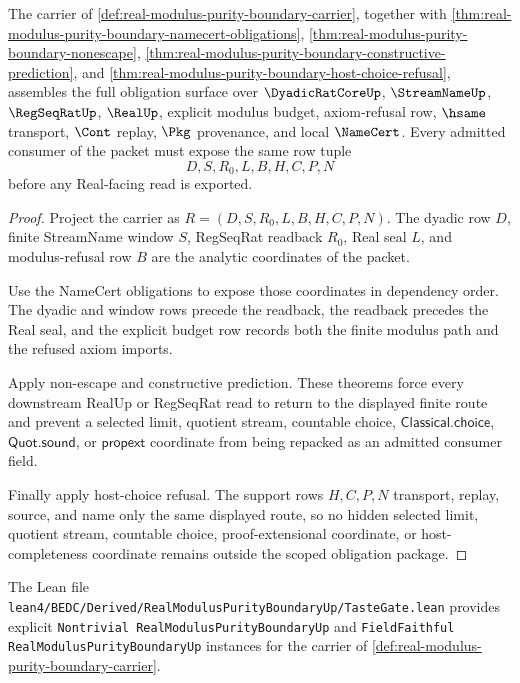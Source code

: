\begin{theorem}
\label{thm:real-modulus-purity-boundary-scope-package}
The carrier of \autoref{def:real-modulus-purity-boundary-carrier}, together with \autoref{thm:real-modulus-purity-boundary-namecert-obligations}, \autoref{thm:real-modulus-purity-boundary-nonescape}, \autoref{thm:real-modulus-purity-boundary-constructive-prediction}, and \autoref{thm:real-modulus-purity-boundary-host-choice-refusal}, assembles the full obligation surface over $\DyadicRatCoreUp$, $\StreamNameUp$, $\RegSeqRatUp$, $\RealUp$, explicit modulus budget, axiom-refusal row, $\hsame$ transport, $\Cont$ replay, $\Pkg$ provenance, and local $\NameCert$. Every admitted consumer of the packet must expose the same row tuple
$$
D,S,R_0,L,B,H,C,P,N
$$
before any Real-facing read is exported.
\end{theorem}
\begin{proof}
Project the carrier as $R=(D,S,R_0,L,B,H,C,P,N)$. The dyadic row $D$, finite StreamName window $S$, RegSeqRat readback $R_0$, Real seal $L$, and modulus-refusal row $B$ are the analytic coordinates of the packet.

Use the NameCert obligations to expose those coordinates in dependency order. The dyadic and window rows precede the readback, the readback precedes the Real seal, and the explicit budget row records both the finite modulus path and the refused axiom imports.

Apply non-escape and constructive prediction. These theorems force every downstream RealUp or RegSeqRat read to return to the displayed finite route and prevent a selected limit, quotient stream, countable choice, $\mathsf{Classical.choice}$, $\mathsf{Quot.sound}$, or $\mathsf{propext}$ coordinate from being repacked as an admitted consumer field.

Finally apply host-choice refusal. The support rows $H,C,P,N$ transport, replay, source, and name only the same displayed route, so no hidden selected limit, quotient stream, countable choice, proof-extensional coordinate, or host-completeness coordinate remains outside the scoped obligation package.
\end{proof}

The Lean file \texttt{lean4/BEDC/Derived/RealModulusPurityBoundaryUp/TasteGate.lean} provides explicit \texttt{Nontrivial RealModulusPurityBoundaryUp} and \texttt{FieldFaithful RealModulusPurityBoundaryUp} instances for the carrier of \autoref{def:real-modulus-purity-boundary-carrier}.

